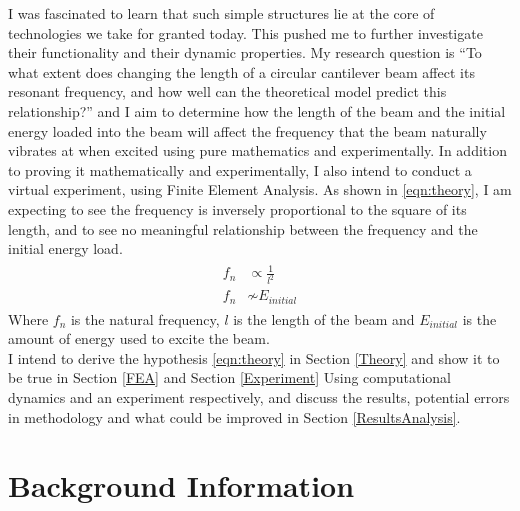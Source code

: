 \documentclass[a4paper,12pt]{article}
\newcommand{\ResearchQ}{To what extent does changing the length of a circular cantilever beam affect its resonant frequency, and how well can the theoretical model predict this relationship?}
\begin{document}
I was fascinated to learn that such simple structures lie at the core of technologies we take for granted today. This pushed me to further investigate their functionality and their dynamic properties. My research question is ``\ResearchQ'' and
I aim to determine how the length of the beam and the initial energy loaded into the beam will affect the frequency that the beam naturally vibrates at when excited using pure mathematics and experimentally.
In addition to proving it mathematically and experimentally, I also intend to conduct a virtual experiment, using Finite Element Analysis.
As shown in \eqref{eqn:theory}, I am expecting to see the frequency is inversely proportional to the square of its length, and to see no meaningful relationship between the frequency and the initial energy load.
\begin{align}%
\label{eqn:theory}
\begin{split}
f_{n}&\propto \frac{1}{l^{2}}
\\
f_{n}&\not\sim E_{initial}
\end{split}
\end{align}
Where $f_n$ is the natural frequency, $l$ is the length of the beam and $E_{initial}$ is the amount of energy used to excite the beam.\\
I intend to derive the hypothesis \eqref{eqn:theory} in Section \ref{Theory} and show it to be true in Section \ref{FEA} and Section \ref{Experiment} Using computational dynamics and an experiment respectively, and discuss the results, potential errors in methodology and what could be improved in Section \ref{ResultsAnalysis}.

\section{Background Information}%
\end{document}
